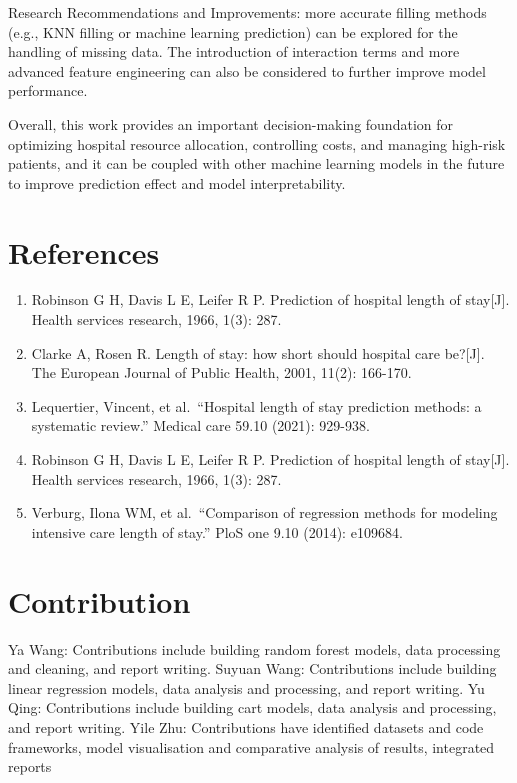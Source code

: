 \documentclass[
  10pt,
]{article}
\providecommand{\tightlist}{%
  \setlength{\itemsep}{0pt}\setlength{\parskip}{0pt}}
\begin{document}
Research Recommendations and Improvements: more accurate filling methods
(e.g., KNN filling or machine learning prediction) can be explored for
the handling of missing data. The introduction of interaction terms and
more advanced feature engineering can also be considered to further
improve model performance.

Overall, this work provides an important decision-making foundation for
optimizing hospital resource allocation, controlling costs, and managing
high-risk patients, and it can be coupled with other machine learning
models in the future to improve prediction effect and model
interpretability.

\section{References}\label{references}

\begin{enumerate}
\def\labelenumi{\arabic{enumi}.}
\tightlist
\item
  Robinson G H, Davis L E, Leifer R P. Prediction of hospital length of
  stay{[}J{]}. Health services research, 1966, 1(3): 287.
\item
  Clarke A, Rosen R. Length of stay: how short should hospital care
  be?{[}J{]}. The European Journal of Public Health, 2001, 11(2):
  166-170.
\item
  Lequertier, Vincent, et al.~``Hospital length of stay prediction
  methods: a systematic review.'' Medical care 59.10 (2021): 929-938.
\item
  Robinson G H, Davis L E, Leifer R P. Prediction of hospital length of
  stay{[}J{]}. Health services research, 1966, 1(3): 287.
\item
  Verburg, Ilona WM, et al.~``Comparison of regression methods for
  modeling intensive care length of stay.'' PloS one 9.10 (2014):
  e109684.
\end{enumerate}

\section{Contribution}\label{contribution}

Ya Wang: Contributions include building random forest models, data
processing and cleaning, and report writing. Suyuan Wang: Contributions
include building linear regression models, data analysis and processing,
and report writing. Yu Qing: Contributions include building cart models,
data analysis and processing, and report writing. Yile Zhu:
Contributions have identified datasets and code frameworks, model
visualisation and comparative analysis of results, integrated reports
\end{document}
